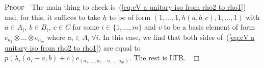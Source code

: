\documentclass[12pt]{article}
\newcounter{example}[section]
\newcommand{\bPf}{\noindent \textsc{Proof\ }}
\newcommand{\cH}{\ensuremath{\mathcal{H}}}
\newcommand{\cO}{\ensuremath{\mathcal{O}}}
\newcommand{\ePf}{~$\Box$\vertsp\par}%
\newcommand{\ff}{\ensuremath{\mathfrak{f}}}
\renewcommand{\rem}{\refstepcounter{rem}\noindent{\sc Remark \therem}}
\newcommand{\sep}{\ \\================================================== \\}
\renewcommand{\therem}{\thesection.\arabic{rem}}
\newcommand{\vertsp}{\vspace{1ex}}
\newcommand{\Hei}[4]{\cH({#1},{#2},{#3},{#4})}
\newcommand{\HeiStan}{\Hei{A}{B}{C}{\lambda}}
\begin{document}
\bPf\ The main thing to check is~(\ref{eq:cV a unitary iso from rho2 to rho1}) and, for this, it suffices to take  $\underline{h}$ to be of form $(1,\ldots,1,h(a,b,c),1,\ldots,1)$ with $a\in A_i,\ b\in B_i,\ c\in C$ for some $i\in\{1,\ldots,m\}$ 
and $v$ to be a basis element 
of form $e_{a_1}\otimes\ldots\otimes  e_{a_m}$ where $a_i\in A_i\ \forall i$. In this case, we find that both sides of~(\ref{eq:cV a unitary iso from rho2 to rho1}) are equal to 
$p(\lambda_i(a_i-a,b)+c)e_{(a_1,\ldots,a_i-a,\ldots,a_m)}$. The rest is LTR.
\ePf
%
\end{document}
